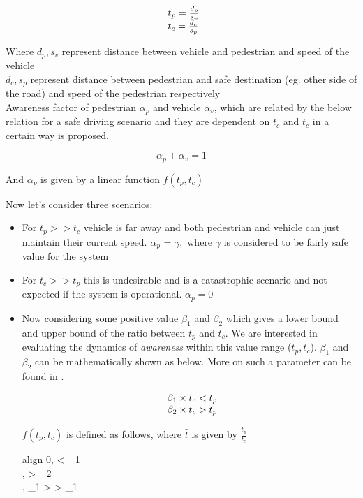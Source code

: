 \begin{equation}
\begin{array}{l@{}}
  t_p = \frac{d_p}{s_v} \\
	t_c = \frac{d_c}{s_p}
\end{array}
\end{equation}

Where ${d_p},{s_v}$ represent distance between vehicle and pedestrian and speed of the vehicle\\
${d_c}, {s_p}$ represent distance between pedestrian and safe destination (eg. other side of the road) and speed of the pedestrian respectively \\
Awareness factor of pedestrian ${\alpha_p}$ and vehicle ${\alpha_v}$, 
which are related by the below relation for a safe driving scenario and they are dependent on ${t_c}$ and ${t_c}$ in a certain way is proposed.

\comment
{
}
\begin{equation} \label{awareness_factor}
  \alpha_p + \alpha_v = 1
\end{equation}

And $\alpha_p$ is given by a linear function \cite{osaragi2004modeling} $f(t_p, t_c)$ 

Now let's consider three scenarios:

\begin{itemize}
\item 
For ${t_p}>>{t_c}$ vehicle is far away and both pedestrian and vehicle can just maintain their current speed. $\alpha_p$ = $\gamma,$ where $\gamma$ is considered to be fairly safe value for the system

\item 
For ${t_c}>>{t_p}$ this is undesirable and is a catastrophic scenario and not expected if the system is operational. $\alpha_p = 0$

\item
	Now considering some positive value $\beta_1$ and $\beta_2$ which gives a lower bound and upper bound of the ratio between $t_p$ and $t_c$. We are interested in evaluating the dynamics of \textit{awareness} within this value range ($t_p, t_c$). $\beta_1$ and $\beta_2$ can be mathematically shown as below. More on such a parameter can be found in \cite{yousef2016forward}.

	\begin{equation}
	\begin{array}{l@{}}
		\beta_1 \times {t_c} < {t_p} \\
		\beta_2 \times {t_c} > {t_p}
	\end{array}
	\end{equation}

	$f(t_p, t_c)$ is defined as follows, where $\hat{t}$ is given by $\frac{t_p}{t_c}$\\
	\begin{empheq}[left=\empheqlbrace]{align}
		0,  < \beta_1 \\
		\gamma,  > \beta_2 \\
		\gamma \times {}, \beta_1 >  > \beta_1
	\end{empheq}

\end {itemize}

